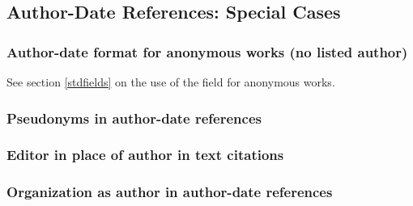 \documentclass[11pt,letterpaper,oneside]{article}
\begin{document}
\setcounter{subsection}{2}
\subsection{Author-Date References: Special Cases}
\setcounter{subsection}{15}

\setcounter{subsubsection}{33}
\subsubsection{Author-date format for anonymous works (no listed author)}

See section \ref{stdfields} on the use of the 
field for anonymous works.

\begin{citeref}
\item \parencite{anon1610}
\item \parencite{anon1547}
\item \parencite{horsley1796}
\item \parencite{hawkes1834}
\end{citeref}

\subsubsection{Pseudonyms in author-date references}

\begin{citeref}
\item \parencite{stendhal1925}
\end{citeref}

\subsubsection{Editor in place of author in text citations}

\begin{citeref}
\item \parencite{silverstein1974}
\item \parencite{soltes1999}
\end{citeref}

\subsubsection{Organization as author in author-date references}
\end{document}
